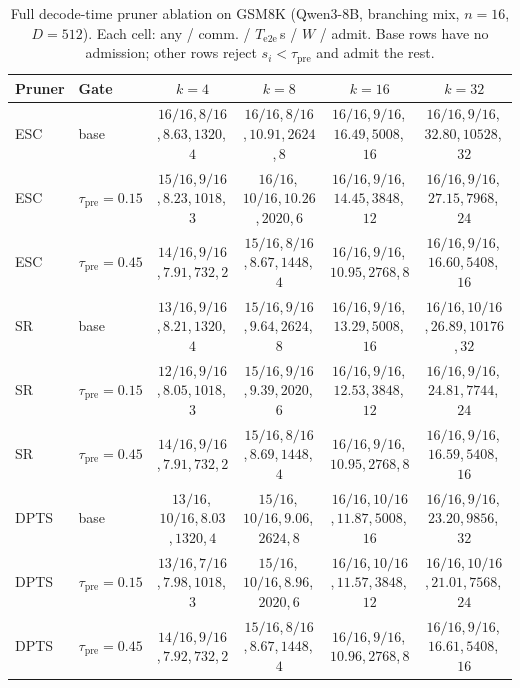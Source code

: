 \begin{table}[t]
\centering
\caption{Full decode-time pruner ablation on GSM8K (Qwen3-8B, branching mix, $n{=}16$, $D{=}512$).
Each cell: any / comm. / $T_{\mathrm{e2e}}$\,s / $W$ / admit.
Base rows have no admission; other rows reject $s_i{<}\tau_{\mathrm{pre}}$ and admit the rest.}
\label{tab:ablate-thresh}
\scriptsize
\setlength{\tabcolsep}{1.8pt}
\begin{tabular}{@{}llcccc@{}}
\toprule
Pruner & Gate & $k{=}4$ & $k{=}8$ & $k{=}16$ & $k{=}32$ \\
\midrule
ESC
 & base
 & $16/16$,\,$8/16$,\,$8.63$,\,$1320$,\,$4$
 & $16/16$,\,$8/16$,\,$10.91$,\,$2624$,\,$8$
 & $16/16$,\,$9/16$,\,$16.49$,\,$5008$,\,$16$
 & $16/16$,\,$9/16$,\,$32.80$,\,$10528$,\,$32$ \\
\rowcolor{tblalt}
ESC
 & $\tau_{\mathrm{pre}}{=}0.15$
 & $15/16$,\,$9/16$,\,$8.23$,\,$1018$,\,$3$
 & $16/16$,\,$10/16$,\,$10.26$,\,$2020$,\,$6$
 & $16/16$,\,$9/16$,\,$14.45$,\,$3848$,\,$12$
 & $16/16$,\,$9/16$,\,$27.15$,\,$7968$,\,$24$ \\
ESC
 & $\tau_{\mathrm{pre}}{=}0.45$
 & $14/16$,\,$9/16$,\,$7.91$,\,$732$,\,$2$
 & $15/16$,\,$8/16$,\,$8.67$,\,$1448$,\,$4$
 & $16/16$,\,$9/16$,\,$10.95$,\,$2768$,\,$8$
 & $16/16$,\,$9/16$,\,$16.60$,\,$5408$,\,$16$ \\
\midrule
SR
 & base
 & $13/16$,\,$9/16$,\,$8.21$,\,$1320$,\,$4$
 & $15/16$,\,$9/16$,\,$9.64$,\,$2624$,\,$8$
 & $16/16$,\,$9/16$,\,$13.29$,\,$5008$,\,$16$
 & $16/16$,\,$10/16$,\,$26.89$,\,$10176$,\,$32$ \\
\rowcolor{tblalt}
SR
 & $\tau_{\mathrm{pre}}{=}0.15$
 & $12/16$,\,$9/16$,\,$8.05$,\,$1018$,\,$3$
 & $15/16$,\,$9/16$,\,$9.39$,\,$2020$,\,$6$
 & $16/16$,\,$9/16$,\,$12.53$,\,$3848$,\,$12$
 & $16/16$,\,$9/16$,\,$24.81$,\,$7744$,\,$24$ \\
SR
 & $\tau_{\mathrm{pre}}{=}0.45$
 & $14/16$,\,$9/16$,\,$7.91$,\,$732$,\,$2$
 & $15/16$,\,$8/16$,\,$8.69$,\,$1448$,\,$4$
 & $16/16$,\,$9/16$,\,$10.95$,\,$2768$,\,$8$
 & $16/16$,\,$9/16$,\,$16.59$,\,$5408$,\,$16$ \\
\midrule
DPTS
 & base
 & $13/16$,\,$10/16$,\,$8.03$,\,$1320$,\,$4$
 & $15/16$,\,$10/16$,\,$9.06$,\,$2624$,\,$8$
 & $16/16$,\,$10/16$,\,$11.87$,\,$5008$,\,$16$
 & $16/16$,\,$9/16$,\,$23.20$,\,$9856$,\,$32$ \\
\rowcolor{tblalt}
DPTS
 & $\tau_{\mathrm{pre}}{=}0.15$
 & $13/16$,\,$7/16$,\,$7.98$,\,$1018$,\,$3$
 & $15/16$,\,$10/16$,\,$8.96$,\,$2020$,\,$6$
 & $16/16$,\,$10/16$,\,$11.57$,\,$3848$,\,$12$
 & $16/16$,\,$10/16$,\,$21.01$,\,$7568$,\,$24$ \\
DPTS
 & $\tau_{\mathrm{pre}}{=}0.45$
 & $14/16$,\,$9/16$,\,$7.92$,\,$732$,\,$2$
 & $15/16$,\,$8/16$,\,$8.67$,\,$1448$,\,$4$
 & $16/16$,\,$9/16$,\,$10.96$,\,$2768$,\,$8$
 & $16/16$,\,$9/16$,\,$16.61$,\,$5408$,\,$16$ \\
\bottomrule
\end{tabular}
\end{table}

